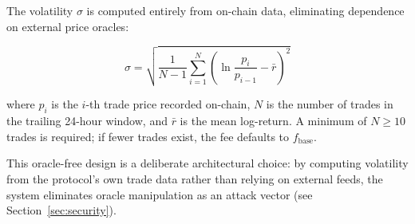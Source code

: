 The volatility $\sigma$ is computed entirely from on-chain data, eliminating
dependence on external price oracles:

\begin{equation}
  \sigma = \sqrt{\frac{1}{N-1} \sum_{i=1}^{N} \left(\ln\frac{p_i}{p_{i-1}} - \bar{r}\right)^2}
  \label{eq:realized-vol}
\end{equation}

where $p_i$ is the $i$-th trade price recorded on-chain, $N$ is the number of
trades in the trailing 24-hour window, and $\bar{r}$ is the mean log-return.
A minimum of $N \geq 10$ trades is required; if fewer trades exist, the fee
defaults to $f_{\text{base}}$.

This oracle-free design is a deliberate architectural choice: by computing
volatility from the protocol's own trade data rather than relying on external
feeds, the system eliminates oracle manipulation as an attack vector (see
Section~\ref{sec:security}).

